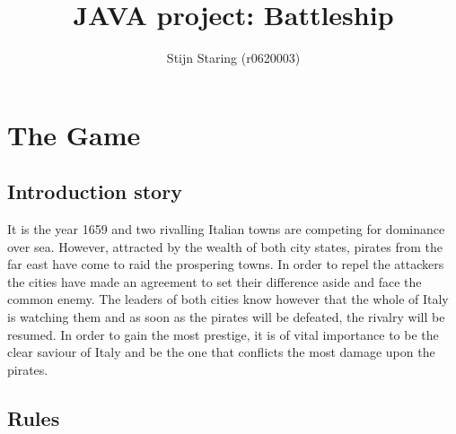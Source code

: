 \documentclass[a4paper,10pt]{article}
\title{JAVA project: Battleship}
\author{Stijn Staring (r0620003)}
\begin{document}
\selectfont{}

\maketitle


\section{The Game}

\subsection{Introduction story}
It is the year 1659 and two rivalling Italian towns are competing for dominance over sea. However, attracted by the wealth of both city states, pirates from the far east have come to raid the prospering towns. In order to repel the attackers the cities have made an agreement to set their difference aside and face the common enemy. The leaders of both cities know however that the whole of Italy is watching them and as soon as the pirates will be defeated, the rivalry will be resumed. In order to gain the most prestige, it is of vital importance to be the clear saviour of Italy and be the one that conflicts the most damage upon the pirates. 

\subsection{Rules}
\end{document}
